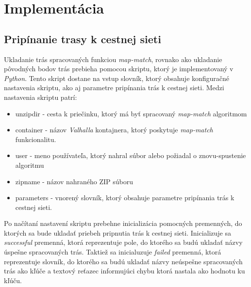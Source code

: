 \section{Implementácia}
\subsection{Pripínanie trasy k cestnej sieti}

Ukladanie trás spracovaných funkciou \textit{map-match}, rovnako ako ukladanie pôvodných bodov trás prebieha pomocou skriptu, ktorý je implementovaný v \textit{Python}. Tento skript dostane na vstup slovník, ktorý obsahuje konfiguračné nastavenia skriptu, ako aj parametre pripínania trás k cestnej sieti. Medzi nastavenia skriptu patrí:
\begin{itemize}
  \item unzipdir - cesta k priečinku, ktorý má byť spracovaný \textit{map-match} algoritmom
  \item container - názov \textit{Valhalla} kontajnera, ktorý poskytuje \textit{map-match} funkcionalitu.
  \item user - meno používateľa, ktorý nahral súbor alebo požiadal o znovu-spustenie algoritmu
  \item zipname - názov nahraného ZIP súboru
  \item parameters - vnorený slovník, ktorý obsahuje parametre pripínania trás k cestnej sieti.
\end{itemize}

Po načítaní nastavení skriptu prebehne inicializácia pomocných premenných, do ktorých sa bude ukladať priebeh pripnutia trás k cestnej sieti. Inicializuje sa \textit{successful} premenná, ktorá reprezentuje pole, do ktorého sa budú ukladať názvy úspešne spracovaných trás. Taktiež sa inicialuzuje \textit{failed} premenná, ktorá reprezentuje slovník, do ktorého sa budú ukladať názvy neúspešne spracovaných trás ako kľúče a textový reťazec informujúci chybu ktorá nastala ako hodnotu ku kľúču.


